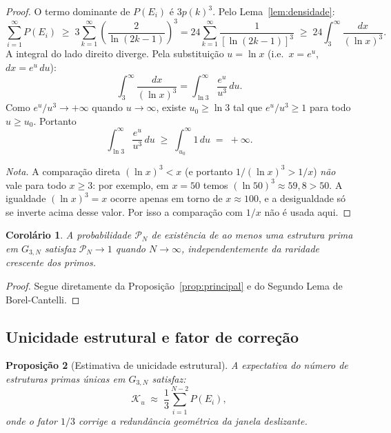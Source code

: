 \documentclass{article}
\newtheorem{proposition}{Proposição}[section]
\newtheorem{corollary}[proposition]{Corolário}
\begin{document}
	\begin{proof}
		O termo dominante de $P(E_i)$ é $3p(k)^3$. Pelo
		Lema~\ref{lem:densidade}:
		\[
		\sum_{i=1}^{\infty} P(E_i)
		\;\geq\; 3\sum_{k=1}^{\infty}
		\left(\frac{2}{\ln(2k-1)}\right)^3
		= 24\sum_{k=1}^{\infty} \frac{1}{[\ln(2k-1)]^3}
		\;\geq\; 24\int_{3}^{\infty}\frac{dx}{(\ln x)^3}.
		\]
		A integral do lado direito diverge. Pela substituição
		$u = \ln x$ (i.e.\ $x = e^u$, $dx = e^u\,du$):
		\[
		\int_{3}^{\infty}\frac{dx}{(\ln x)^3}
		= \int_{\ln 3}^{\infty}\frac{e^u}{u^3}\,du.
		\]
		Como $e^u/u^3 \to +\infty$ quando $u \to \infty$, existe
		$u_0 \geq \ln 3$ tal que $e^u/u^3 \geq 1$ para todo $u \geq u_0$.
		Portanto
		\[
		\int_{\ln 3}^{\infty}\frac{e^u}{u^3}\,du
		\;\geq\; \int_{u_0}^{\infty} 1\,du \;=\; +\infty.
		\]
		
		\smallskip
		\noindent\textit{Nota.}
		A comparação direta $(\ln x)^3 < x$ (e portanto
		$1/(\ln x)^3 > 1/x$) \emph{não} vale para todo $x \geq 3$:
		por exemplo, em $x = 50$ temos $(\ln 50)^3 \approx 59{,}8 > 50$.
		A igualdade $(\ln x)^3 = x$ ocorre apenas em torno de
		$x \approx 100$, e a desigualdade só se inverte acima desse valor.
		Por isso a comparação com $1/x$ não é usada aqui.
	\end{proof}
	
	\begin{corollary}
		\label{cor:quasecerto}
		A probabilidade $\mathcal{P}_N$ de existência de ao menos uma
		estrutura prima em $G_{3,N}$ satisfaz $\mathcal{P}_N \to 1$
		quando $N \to \infty$, independentemente da raridade crescente
		dos primos.
	\end{corollary}
	
	\begin{proof}
		Segue diretamente da Proposição~\ref{prop:principal} e do
		Segundo Lema de Borel-Cantelli.
	\end{proof}
	
	\subsection{Unicidade estrutural e fator de correção}
	
	\begin{proposition}[Estimativa de unicidade estrutural]
		\label{prop:unicidade}
		A expectativa do número de estruturas primas \emph{únicas}
		em $G_{3,N}$ satisfaz:
		\[
		\mathcal{K}_u \;\approx\; \frac{1}{3}\sum_{i=1}^{N-2} P(E_i),
		\]
		onde o fator $1/3$ corrige a redundância geométrica da janela
		deslizante.
	\end{proposition}
	
\end{document}
